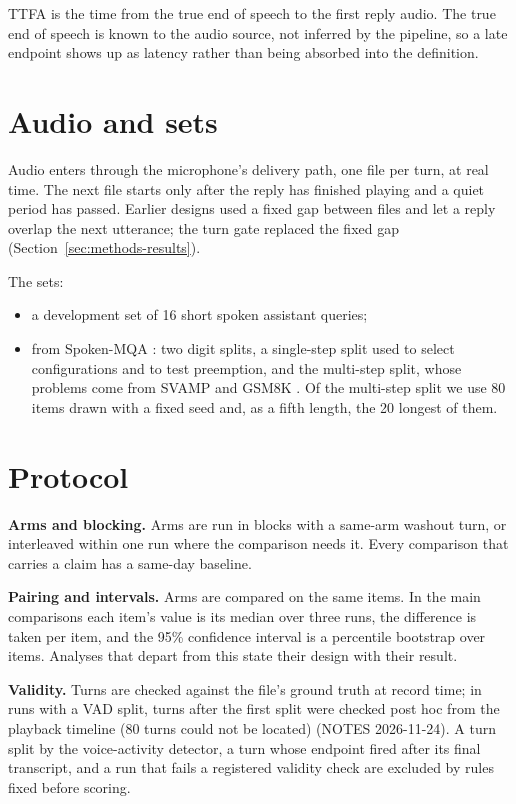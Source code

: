 TTFA is the time from the true end of speech to the first reply audio. The
true end of speech is known to the audio source, not inferred by the pipeline,
so a late endpoint shows up as latency rather than being absorbed into the
definition.

\section{Audio and sets}
\label{sec:sets}

Audio enters through the microphone's delivery path, one file per turn, at
real time. The next file starts only after the reply has finished playing and
a quiet period has passed. Earlier designs used a fixed gap between files and
let a reply overlap the next utterance; the turn gate replaced the fixed gap
(Section~\ref{sec:methods-results}).

The sets:
\begin{itemize}
\item a development set of 16 short spoken assistant queries;
\item from Spoken-MQA \cite{wei2025towards}: two digit splits, a single-step
  split used to select configurations and to test preemption, and the
  multi-step split, whose problems come from SVAMP \cite{patel2021svamp} and
  GSM8K \cite{cobbe2021gsm8k}. Of the
  multi-step split we use 80 items drawn with a fixed seed and, as a fifth
  length, the 20 longest of them.
\end{itemize}

\section{Protocol}
\label{sec:protocol}

\textbf{Arms and blocking.} Arms are run in blocks with a same-arm washout
turn, or interleaved within one run where the comparison needs it. Every
comparison that carries a claim has a same-day baseline.

\textbf{Pairing and intervals.} Arms are compared on the same items. In the
main comparisons each item's value is its median over three runs, the
difference is taken per item, and the 95\% confidence interval is a
percentile bootstrap over items. Analyses that depart from this state their
design with their result.

\textbf{Validity.} Turns are checked against the file's ground truth at record
time; in runs with a VAD split, turns after the first split were checked post
hoc from the playback timeline (80 turns could not be located) (NOTES
2026-11-24). A turn
split by the voice-activity detector, a turn whose endpoint fired after its
final transcript, and a run that fails a registered validity check are
excluded by rules fixed before scoring.

